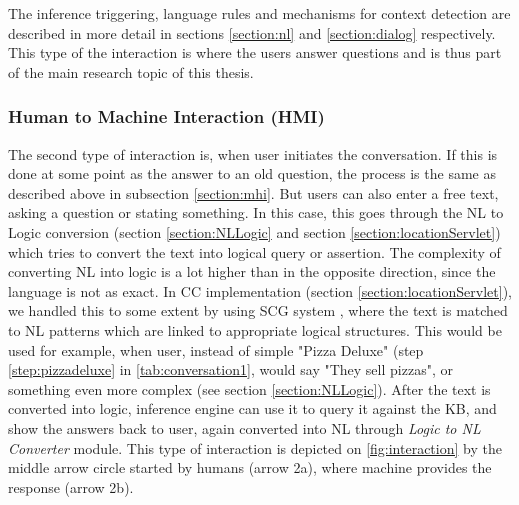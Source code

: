 The inference triggering, language rules and mechanisms for context detection
are described in more detail in sections \ref{section:nl} and 
\ref{section:dialog} respectively. This
type of the interaction is where the users answer questions and is thus part of
the main research topic of this thesis.

\subsubsection{Human to Machine Interaction (HMI)}
\label{section:hmi}
The second type of interaction is, when user initiates the conversation. 
If this is done at some point as the answer to an old question, the process is 
the same as described above in subsection \ref{section:mhi}. But users can 
also enter a 
free text, asking a question or stating something. In this case, this goes 
through the NL to Logic conversion (section \ref{section:NLLogic} and section 
\ref{section:locationServlet}) which tries to convert the
text into logical query or assertion. The complexity of converting NL into logic 
is a lot higher than in the opposite direction, since the language is not
as exact. In CC implementation (section \ref{section:locationServlet}), we 
handled this to
some extent by using SCG system \parencite{Schneider2015}, where the text
is matched to NL patterns which are linked to appropriate logical structures.
This would be used for example, when user, instead of simple "Pizza Deluxe" 
(step \ref{step:pizzadeluxe} in \autoref{tab:conversation1}, would say 
"They sell pizzas", or something even more complex (see section 
\ref{section:NLLogic}). After the text is converted into logic, inference engine 
can use it to query it against the KB, and show the answers back to user, again 
converted into NL through \emph{Logic to NL Converter} module. This type of
interaction is depicted on \autoref{fig:interaction} by the middle arrow circle
started by humans (arrow 2a), where machine provides the response (arrow 2b).

